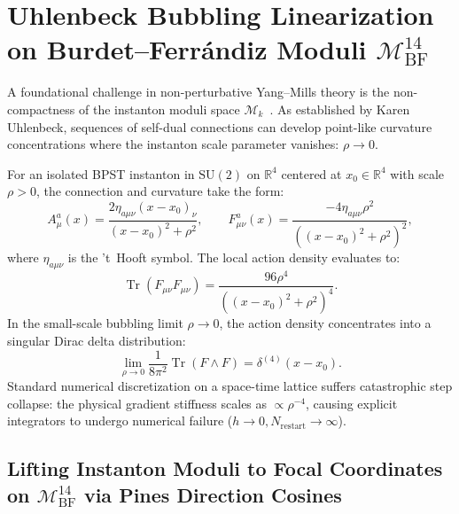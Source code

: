 \documentclass[11pt,a4paper,reqno]{article}
\theoremstyle{plain}
\theoremstyle{definition}
\theoremstyle{remark}
\numberwithin{equation}{section}
\newcommand{\Mbf}{\mathcal{M}_{\mathrm{BF}}^{14}}
\begin{document}
\section{Uhlenbeck Bubbling Linearization on Burdet--Ferr\'andiz Moduli \texorpdfstring{$\Mbf$}{M\_BF\textasciicircum 14}}
\label{sec:uhlenbeck_regularization}

A foundational challenge in non-perturbative Yang--Mills theory is the non-compactness of the instanton moduli space $\mathcal{M}_k$~\cite{Uhlenbeck1982, AtiyahHitchinSinger1978}. As established by Karen Uhlenbeck, sequences of self-dual connections can develop point-like curvature concentrations where the instanton scale parameter vanishes: $\rho \to 0$.

For an isolated BPST instanton in $\mathrm{SU}(2)$ on $\mathbb{R}^4$ centered at $x_0 \in \mathbb{R}^4$ with scale $\rho > 0$, the connection and curvature take the form:
\begin{equation}
  A_\mu^a(x) = \frac{2 \eta_{a\mu\nu} (x - x_0)_\nu}{(x - x_0)^2 + \rho^2}, \qquad F_{\mu\nu}^a(x) = \frac{-4 \eta_{a\mu\nu} \rho^2}{\left( (x - x_0)^2 + \rho^2 \right)^2},
  \label{eq:bpst_instanton}
\end{equation}
where $\eta_{a\mu\nu}$ is the 't~Hooft symbol. The local action density evaluates to:
\begin{equation}
  \operatorname{Tr}(F_{\mu\nu} F_{\mu\nu}) = \frac{96 \rho^4}{\left( (x - x_0)^2 + \rho^2 \right)^4}.
\end{equation}
In the small-scale bubbling limit $\rho \to 0$, the action density concentrates into a singular Dirac delta distribution:
\begin{equation}
  \lim_{\rho \to 0} \frac{1}{8\pi^2} \operatorname{Tr}(F \wedge F) = \delta^{(4)}(x - x_0).
\end{equation}
Standard numerical discretization on a space-time lattice suffers catastrophic step collapse: the physical gradient stiffness scales as $\propto \rho^{-4}$, causing explicit integrators to undergo numerical failure ($h \to 0, N_{\mathrm{restart}} \to \infty$).

\subsection{Lifting Instanton Moduli to Focal Coordinates on \texorpdfstring{$\Mbf$}{M\_BF\textasciicircum 14} via Pines Direction Cosines}
\label{subsec:lifting_instanton_bf14}
\end{document}
